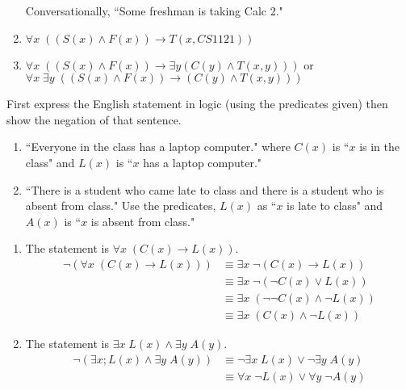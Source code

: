 \documentclass[12pt,addpoints]{exam}
\newcommand{\ra}{\rightarrow}
\begin{document}
\begin{questions}
\begin{solution}
\begin{enumerate}[label=(\alph*),itemsep=0pt,parsep=0pt,topsep=0pt,partopsep=0pt]
            Conversationally, ``Some freshman is taking Calc 2."
        \item $\forall x\; ((S(x) \wedge F(x)) \ra T(x,CS 1121))$
        \item $\forall x\; ((S(x) \wedge F(x)) \ra \exists y (C(y) \wedge T(x,y)))$ or $\forall x\; \exists y\; ((S(x) \wedge F(x)) \ra (C(y) \wedge T(x,y)))$
    \end{enumerate}
\end{solution}


\question[8] First express the English statement in logic (using the predicates given) then show the negation of that sentence.
\begin{enumerate}[label=(\alph*),itemsep=0pt,parsep=0pt,topsep=0pt,partopsep=0pt]
    \item ``Everyone in the class has a laptop computer." where $C(x)$ is ``$x$ is in the class" and $L(x)$ is ``$x$ has a laptop computer."
    \item ``There is a student who came late to class and there is a student who is absent from class." Use the predicates, $L(x)$ as ``$x$ is late to class" and $A(x)$ is ``$x$ is absent from class."
\end{enumerate}
    \ifprintanswers
        \vspace{-10pt}
    \fi
\begin{solution}
    \begin{enumerate}[label=(\alph*),itemsep=0pt,parsep=0pt,topsep=0pt,partopsep=0pt]
        \item The statement is $\forall x\; (C(x) \ra L(x))$.
        \begin{align*}
            \neg (\forall x\; (C(x) \ra L(x))) & \equiv \exists x\; \neg (C(x) \ra L(x)) \\
            & \equiv \exists x\; \neg (\neg C(x) \vee L(x)) \\
            & \equiv \exists x\; (\neg \neg C(x) \wedge \neg L(x)) \\
            & \equiv \exists x\; (C(x) \wedge \neg L(x))
        \end{align*}
        \item The statement is $\exists x\; L(x) \wedge \exists y\; A(y)$.
        \begin{align*}
          \neg (\exists x; L(x) \wedge \exists y\; A(y)) &\equiv \neg \exists x\; L(x) \vee \neg \exists y\; A(y) \\
          & \equiv \forall x\; \neg L(x) \vee \forall y\; \neg A(y)
        \end{align*}
    \end{enumerate}
\end{solution}



\end{questions}
\end{document}
